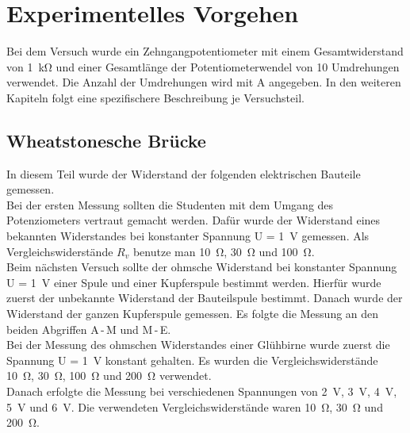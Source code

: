 \documentclass[a4paper,usenatbib]{aspdoc}
\begin{document}
    
    
    \section{Experimentelles Vorgehen}\label{sec:experiment}
        Bei dem Versuch wurde ein Zehngangpotentiometer mit einem Gesamtwiderstand von \SI{1}{\kilo\ohm} und einer Gesamtlänge der Potentiometerwendel von 10 Umdrehungen verwendet. Die Anzahl der Umdrehungen wird mit A angegeben. In den weiteren Kapiteln folgt eine spezifischere Beschreibung je Versuchsteil. 
        
        \subsection{Wheatstonesche Brücke}\label{subsec:experiment_wheatstone}
            In diesem Teil wurde der Widerstand der folgenden elektrischen Bauteile gemessen.\\
            Bei der ersten Messung sollten die Studenten mit dem Umgang des Potenziometers vertraut gemacht werden. Dafür wurde der Widerstand eines bekannten Widerstandes bei konstanter Spannung U = \SI{1}{\volt} gemessen. Als Vergleichswiderstände $R_v$ benutze man \SI{10}{\ohm}, \SI{30}{\ohm} und \SI{100}{\ohm}.\\
            Beim nächsten Versuch sollte der ohmsche Widerstand bei konstanter Spannung U = \SI{1}{\volt} einer Spule und einer Kupferspule bestimmt werden. Hierfür wurde zuerst der unbekannte Widerstand der Bauteilspule bestimmt. Danach wurde der Widerstand der ganzen Kupferspule gemessen. Es folgte die Messung an den beiden Abgriffen A\,-\,M und M\,-\,E.\\
            Bei der Messung des ohmschen Widerstandes einer Glühbirne wurde zuerst die Spannung U = \SI{1}{\volt} konstant gehalten. Es wurden die Vergleichswiderstände \SI{10}{\ohm}, \SI{30}{\ohm}, \SI{100}{\ohm} und \SI{200}{\ohm} verwendet.\\
            Danach erfolgte die Messung bei verschiedenen Spannungen von \SI{2}{\volt}, \SI{3}{\volt}, \SI{4}{\volt}, \SI{5}{\volt} und \SI{6}{\volt}. Die verwendeten Vergleichswiderstände waren \SI{10}{\ohm}, \SI{30}{\ohm} und \SI{200}{\ohm}.
            
                
\end{document}
